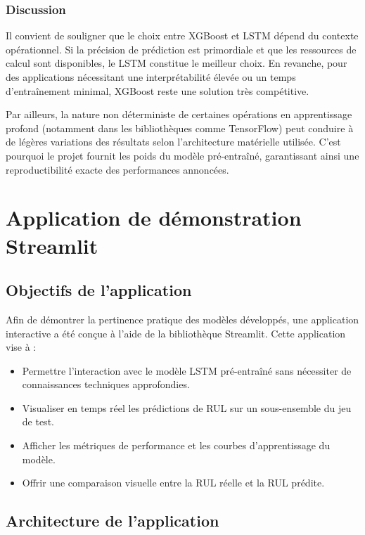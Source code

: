 \documentclass[12pt,a4paper]{report}
\theoremstyle{definition}
\begin{document}
\subsection{Discussion}

Il convient de souligner que le choix entre XGBoost et LSTM dépend du contexte opérationnel. Si la précision de prédiction est primordiale et que les ressources de calcul sont disponibles, le LSTM constitue le meilleur choix. En revanche, pour des applications nécessitant une interprétabilité élevée ou un temps d'entraînement minimal, XGBoost reste une solution très compétitive.

Par ailleurs, la nature non déterministe de certaines opérations en apprentissage profond (notamment dans les bibliothèques comme TensorFlow) peut conduire à de légères variations des résultats selon l'architecture matérielle utilisée. C'est pourquoi le projet fournit les poids du modèle pré-entraîné, garantissant ainsi une reproductibilité exacte des performances annoncées.

\chapter{Application de démonstration Streamlit}\label{chap:demo}

\section{Objectifs de l'application}

Afin de démontrer la pertinence pratique des modèles développés, une application interactive a été conçue à l'aide de la bibliothèque Streamlit. Cette application vise à :
\begin{itemize}
    \item Permettre l'interaction avec le modèle LSTM pré-entraîné sans nécessiter de connaissances techniques approfondies.
    \item Visualiser en temps réel les prédictions de RUL sur un sous-ensemble du jeu de test.
    \item Afficher les métriques de performance et les courbes d'apprentissage du modèle.
    \item Offrir une comparaison visuelle entre la RUL réelle et la RUL prédite.
\end{itemize}

\section{Architecture de l'application}
\end{document}
